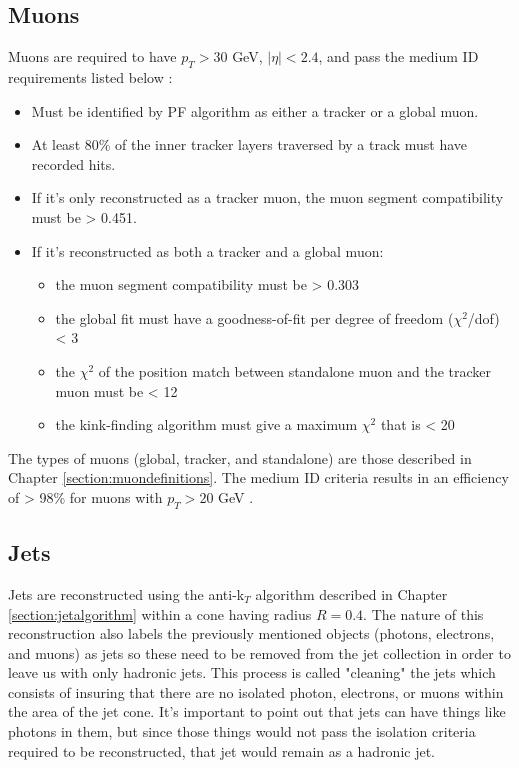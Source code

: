 \subsection{Muons}
Muons are required to have $p_T > 30$ GeV, $|\eta|<2.4$, and pass the medium ID requirements listed below \cite{Sirunyan_2018}:
\begin{itemize}
	\item Must be identified by PF algorithm as either a tracker or a global muon.
	\item At least 80\% of the inner tracker layers traversed by a track must have recorded hits.
	\item If it's only reconstructed as a tracker muon, the muon segment compatibility must be > 0.451.
	\item If it's reconstructed as both a tracker and a global muon:
	\begin{itemize}
		\item the muon segment compatibility must be > 0.303
		\item the global fit must have a goodness-of-fit per degree of freedom  ($\chi^2$/dof) < 3
		\item the $\chi^2$ of the position match between standalone muon and the tracker muon must be < 12
		\item the kink-finding algorithm must give a maximum $\chi^2$ that is < 20
	\end{itemize}
\end{itemize}		
The types of muons (global, tracker, and standalone) are those described in Chapter \ref{section:muondefinitions}.  The medium ID criteria results in an efficiency of > 98\% for muons with $p_T > 20$ GeV \cite{MuonIDPerf}.

\subsection{Jets}
Jets are reconstructed using the anti-k$_T$ algorithm described in Chapter \ref{section:jetalgorithm} within a cone having radius $R = 0.4$.  The nature of this reconstruction also labels the previously mentioned objects (photons, electrons, and muons) as jets so these need to be removed from the jet collection in order to leave us with only hadronic jets.  This process is called "cleaning" the jets which consists of insuring that there are no isolated photon, electrons, or muons within the area of the jet cone.  It's important to point out that jets can have things like photons in them, but since those things would not pass the isolation criteria required to be reconstructed, that jet would remain as a hadronic jet.

